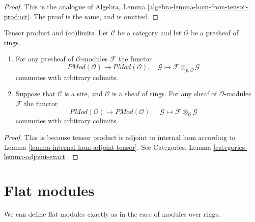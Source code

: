 \begin{proof}
This is the analogue of
Algebra, Lemma \ref{algebra-lemma-hom-from-tensor-product}.
The proof is the same, and is omitted.
\end{proof}

\begin{lemma}
\label{lemma-tensor-commute-colimits}
Tensor product and (co)limits.
Let $\mathcal{C}$ be a category and let $\mathcal{O}$ be a presheaf of rings.
\begin{enumerate}
\item For any presheaf of $\mathcal{O}$-modules $\mathcal{F}$ the functor
$$
\textit{PMod}(\mathcal{O}) \longrightarrow \textit{PMod}(\mathcal{O})
, \quad
\mathcal{G} \longmapsto \mathcal{F} \otimes_{p, \mathcal{O}} \mathcal{G}
$$
commutes with arbitrary colimits.
\item
Suppose that $\mathcal{C}$ is a site, and $\mathcal{O}$ is a sheaf of rings.
For any sheaf of $\mathcal{O}$-modules $\mathcal{F}$ the functor
$$
\textit{PMod}(\mathcal{O}) \longrightarrow \textit{PMod}(\mathcal{O})
, \quad
\mathcal{G} \longmapsto \mathcal{F} \otimes_\mathcal{O} \mathcal{G}
$$
commutes with arbitrary colimits.
\end{enumerate}
\end{lemma}

\begin{proof}
This is because tensor product is adjoint to internal hom according
to Lemma \ref{lemma-internal-hom-adjoint-tensor}.
See Categories, Lemma \ref{categories-lemma-adjoint-exact}.
\end{proof}









\section{Flat modules}
\label{section-flat}

\noindent
We can define flat modules exactly as in the case of modules over rings.

